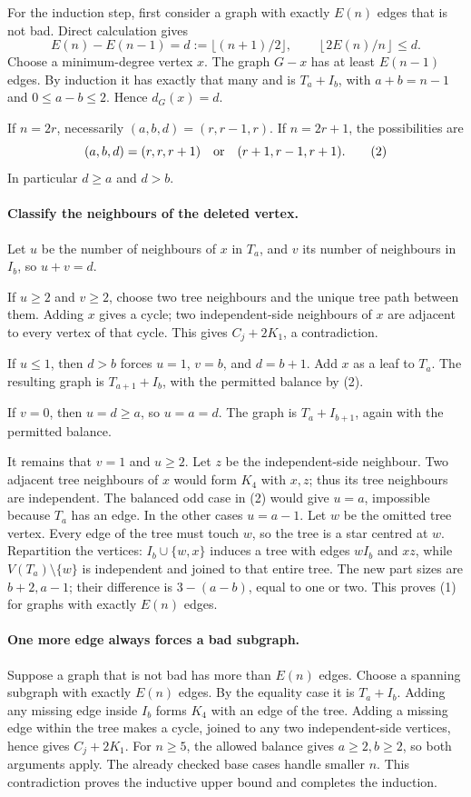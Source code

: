 For the induction step, first consider a graph with exactly \(E(n)\) edges that is not bad. Direct calculation gives
\[
 E(n)-E(n-1)=d:=\lfloor(n+1)/2\rfloor,\qquad
 \left\lfloor 2E(n)/n\right\rfloor\leq d.
\]
Choose a minimum-degree vertex \(x\). The graph \(G-x\) has at least \(E(n-1)\) edges. By induction it has exactly that many and is \(T_a+I_b\), with \(a+b=n-1\) and \(0\leq a-b\leq2\). Hence \(d_G(x)=d\).

If \(n=2r\), necessarily \((a,b,d)=(r,r-1,r)\). If \(n=2r+1\), the possibilities are
\[
 (a,b,d)=(r,r,r+1)\quad\hbox{or}\quad(r+1,r-1,r+1).
\tag{2}
\]
In particular \(d\geq a\) and \(d>b\).

\paragraph{Classify the neighbours of the deleted vertex.}
Let \(u\) be the number of neighbours of \(x\) in \(T_a\), and \(v\) its number of neighbours in \(I_b\), so \(u+v=d\).

If \(u\geq2\) and \(v\geq2\), choose two tree neighbours and the unique tree path between them. Adding \(x\) gives a cycle; two independent-side neighbours of \(x\) are adjacent to every vertex of that cycle. This gives \(C_j+2K_1\), a contradiction.

If \(u\leq1\), then \(d>b\) forces \(u=1\), \(v=b\), and \(d=b+1\). Add \(x\) as a leaf to \(T_a\). The resulting graph is \(T_{a+1}+I_b\), with the permitted balance by (2).

If \(v=0\), then \(u=d\geq a\), so \(u=a=d\). The graph is \(T_a+I_{b+1}\), again with the permitted balance.

It remains that \(v=1\) and \(u\geq2\). Let \(z\) be the independent-side neighbour. Two adjacent tree neighbours of \(x\) would form \(K_4\) with \(x,z\); thus its tree neighbours are independent. The balanced odd case in (2) would give \(u=a\), impossible because \(T_a\) has an edge. In the other cases \(u=a-1\). Let \(w\) be the omitted tree vertex. Every edge of the tree must touch \(w\), so the tree is a star centred at \(w\). Repartition the vertices: \(I_b\cup\{w,x\}\) induces a tree with edges \(wI_b\) and \(xz\), while \(V(T_a)\setminus\{w\}\) is independent and joined to that entire tree. The new part sizes are \(b+2,a-1\); their difference is \(3-(a-b)\), equal to one or two. This proves (1) for graphs with exactly \(E(n)\) edges.

\paragraph{One more edge always forces a bad subgraph.}
Suppose a graph that is not bad has more than \(E(n)\) edges. Choose a spanning subgraph with exactly \(E(n)\) edges. By the equality case it is \(T_a+I_b\). Adding any missing edge inside \(I_b\) forms \(K_4\) with an edge of the tree. Adding a missing edge within the tree makes a cycle, joined to any two independent-side vertices, hence gives \(C_j+2K_1\). For \(n\geq5\), the allowed balance gives \(a\geq2,b\geq2\), so both arguments apply. The already checked base cases handle smaller \(n\). This contradiction proves the inductive upper bound and completes the induction.

